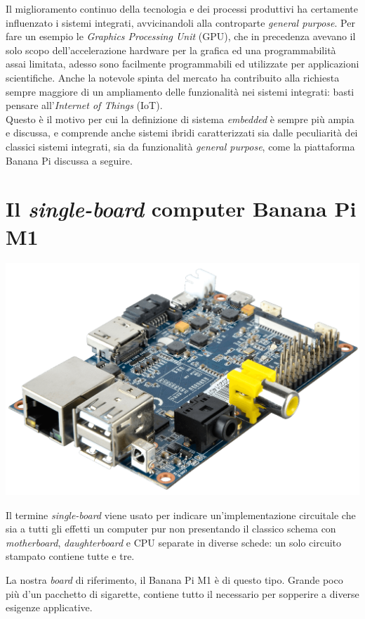 Il miglioramento continuo della tecnologia e dei processi produttivi ha 
certamente influenzato i sistemi integrati, avvicinandoli alla controparte 
\emph{general purpose}. Per fare un esempio le \emph{Graphics Processing Unit} 
(GPU), 
che in precedenza avevano il solo 
scopo dell'accelerazione hardware per la grafica ed una programmabilità assai 
limitata, adesso sono facilmente programmabili ed utilizzate per applicazioni 
scientifiche. Anche la notevole spinta del mercato ha 
contribuito alla richiesta sempre maggiore di un ampliamento delle 
funzionalità nei sistemi integrati: basti pensare all'\emph{Internet of 
Things} (IoT). \\
Questo è il motivo per cui la definizione di sistema \emph{embedded} è sempre 
più ampia e discussa, e comprende anche sistemi ibridi caratterizzati sia 
dalle peculiarità dei classici sistemi integrati, sia da funzionalità 
\emph{general purpose}, come la piattaforma Banana Pi discussa a seguire.

\newpage
\section{Il \emph{single-board} computer Banana Pi M1}
\begin{center}
\includegraphics[width=.7\textwidth]{Figures/bananapi.png}\\
\end{center}
Il termine \emph{single-board} viene usato per indicare un'implementazione 
circuitale che sia a tutti gli effetti un computer pur non presentando il 
classico schema con \emph{motherboard}, \emph{daughterboard} e CPU separate in 
diverse schede: un solo circuito stampato contiene tutte e tre.

La nostra \emph{board} di riferimento, il Banana Pi M1 è di questo tipo. Grande 
poco più d'un pacchetto di sigarette, contiene tutto il necessario per 
sopperire a diverse esigenze applicative.

